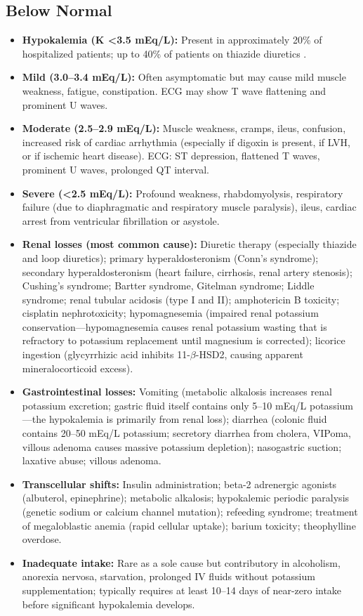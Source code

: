 \subsection*{Below Normal}
\begin{itemize}
  \item \textbf{Hypokalemia (K <3.5 mEq/L):} Present in approximately 20\% of hospitalized patients; up to 40\% of patients on thiazide diuretics \cite{gennari1998hypokalemia}.
  \item \textbf{Mild (3.0--3.4 mEq/L):} Often asymptomatic but may cause mild muscle weakness, fatigue, constipation. ECG may show T wave flattening and prominent U waves.
  \item \textbf{Moderate (2.5--2.9 mEq/L):} Muscle weakness, cramps, ileus, confusion, increased risk of cardiac arrhythmia (especially if digoxin is present, if LVH, or if ischemic heart disease). ECG: ST depression, flattened T waves, prominent U waves, prolonged QT interval.
  \item \textbf{Severe (<2.5 mEq/L):} Profound weakness, rhabdomyolysis, respiratory failure (due to diaphragmatic and respiratory muscle paralysis), ileus, cardiac arrest from ventricular fibrillation or asystole.
  \item \textbf{Renal losses (most common cause):} Diuretic therapy (especially thiazide and loop diuretics); primary hyperaldosteronism (Conn's syndrome); secondary hyperaldosteronism (heart failure, cirrhosis, renal artery stenosis); Cushing's syndrome; Bartter syndrome, Gitelman syndrome; Liddle syndrome; renal tubular acidosis (type I and II); amphotericin B toxicity; cisplatin nephrotoxicity; hypomagnesemia (impaired renal potassium conservation---hypomagnesemia causes renal potassium wasting that is refractory to potassium replacement until magnesium is corrected); licorice ingestion (glycyrrhizic acid inhibits 11-$\beta$-HSD2, causing apparent mineralocorticoid excess).
  \item \textbf{Gastrointestinal losses:} Vomiting (metabolic alkalosis increases renal potassium excretion; gastric fluid itself contains only 5--10 mEq/L potassium---the hypokalemia is primarily from renal loss); diarrhea (colonic fluid contains 20--50 mEq/L potassium; secretory diarrhea from cholera, VIPoma, villous adenoma causes massive potassium depletion); nasogastric suction; laxative abuse; villous adenoma.
  \item \textbf{Transcellular shifts:} Insulin administration; beta-2 adrenergic agonists (albuterol, epinephrine); metabolic alkalosis; hypokalemic periodic paralysis (genetic sodium or calcium channel mutation); refeeding syndrome; treatment of megaloblastic anemia (rapid cellular uptake); barium toxicity; theophylline overdose.
  \item \textbf{Inadequate intake:} Rare as a sole cause but contributory in alcoholism, anorexia nervosa, starvation, prolonged IV fluids without potassium supplementation; typically requires at least 10--14 days of near-zero intake before significant hypokalemia develops.
\end{itemize}


